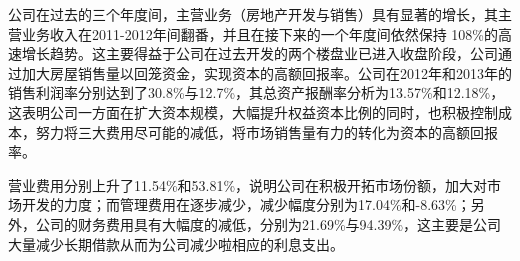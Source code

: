 公司在过去的三个年度间，主营业务（房地产开发与销售）具有显著的增长，其主营业务收入在2011-2012年间翻番，并且在接下来的一个年度间依然保持 108\%的高速增长趋势。这主要得益于公司在过去开发的两个楼盘业已进入收盘阶段，公司通过加大房屋销售量以回笼资金，实现资本的高额回报率。公司在2012年和2013年的销售利润率分别达到了30.8\%与12.7\%，其总资产报酬率分析为13.57\%和12.18\%，这表明公司一方面在扩大资本规模，大幅提升权益资本比例的同时，也积极控制成本，努力将三大费用尽可能的减低，将市场销售量有力的转化为资本的高额回报率。
\begin{note}
营业费用分别上升了11.54\%和53.81\%，说明公司在积极开拓市场份额，加大对市场开发的力度；而管理费用在逐步减少，减少幅度分别为17.04\%和-8.63\%；另外，公司的财务费用具有大幅度的减低，分别为21.69\%与94.39\%，这主要是公司大量减少长期借款从而为公司减少啦相应的利息支出。
\end{note}
\renewcommand*{\arraystretch}{0.8}
\setlength{\tabcolsep}{8pt}
